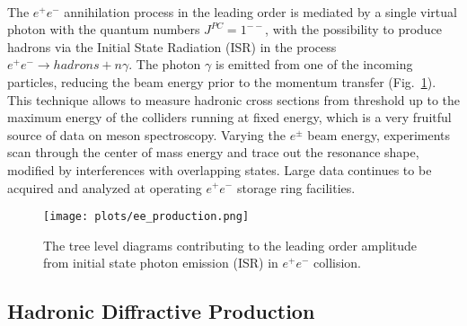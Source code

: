 ~\par The $e^{+}e^{-}$ annihilation process in the leading order is mediated by a single virtual photon with the quantum numbers $J^{PC} = 1^{--}$, with the possibility to produce hadrons via the Initial State Radiation (ISR) in the process $e^{+}e^{-} \rightarrow hadrons + n\gamma$. The photon $\gamma$ is emitted from one of the incoming particles, reducing the beam energy prior to the momentum transfer (Fig.~\ref{fig.1.3.1}). This technique allows to measure hadronic cross sections from threshold up to the maximum energy of the colliders running at fixed energy, which is a very fruitful source of data on meson spectroscopy. Varying the $e^{\pm}$ beam energy, experiments scan through the center of mass energy and trace out the resonance shape, modified by interferences with overlapping states. Large data continues to be acquired and analyzed at operating $e^{+}e^{-}$ storage ring facilities.

\begin{figure}[H]
    \centering
        \texttt{[image: plots/ee\_production.png]}
        \caption{The tree level diagrams contributing to the leading order amplitude from initial state photon emission (ISR) in $e^{+}e^{-}$ collision.}
        \label{fig.1.3.1}
\end{figure}
 
 \subsection{Hadronic Diffractive Production}

